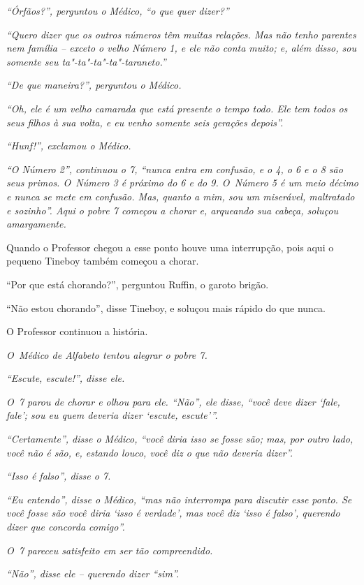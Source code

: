 \emph{``Órfãos?'', perguntou o Médico, ``o que quer dizer?''}

\emph{``Quero dizer que os outros números têm muitas relações. Mas não
tenho parentes nem família -- exceto o velho Número 1, e ele não conta
muito; e, além disso, sou somente seu ta"-ta"-ta"-ta"-taraneto.''}

\emph{``De que maneira?'', perguntou o Médico.}

\emph{``Oh, ele é um velho camarada que está presente o tempo todo. Ele
tem todos os seus filhos à sua volta, e eu venho somente seis gerações
depois''.}

\emph{``Hunf!'', exclamou o Médico.}

\emph{``O Número 2'', continuou o 7, ``nunca entra em confusão, e o 4, o
6 e o 8 são seus primos. O~Número 3 é próximo do 6 e do 9. O~Número 5 é
um meio décimo e nunca se mete em confusão. Mas, quanto a mim, sou um
miserável, maltratado e sozinho''. Aqui o pobre 7 começou a chorar e,
arqueando sua cabeça, soluçou amargamente.}

Quando o Professor chegou a esse ponto houve uma interrupção, pois aqui
o pequeno Tineboy também começou a chorar.

``Por que está chorando?'', perguntou Ruffin, o garoto brigão.

``Não estou chorando'', disse Tineboy, e soluçou mais rápido do que
nunca.

O Professor continuou a história.

\emph{O~Médico de Alfabeto tentou alegrar o pobre 7.}

\emph{``Escute, escute!'', disse ele.}

\emph{O~7 parou de chorar e olhou para ele. ``Não'', ele disse, ``você
deve dizer `fale, fale'; sou eu quem deveria dizer `escute,
escute'''.}

\emph{``Certamente'', disse o Médico, ``você diria isso se fosse são;
mas, por outro lado, você não é são, e, estando louco, você diz o que
não deveria dizer''.}

\emph{``Isso é falso'', disse o 7.}

\emph{``Eu entendo'', disse o Médico, ``mas não interrompa para discutir
esse ponto. Se você fosse são você diria `isso é verdade', mas você diz
`isso é falso', querendo dizer que concorda comigo''.}

\emph{O~7 pareceu satisfeito em ser tão compreendido.}

\emph{``Não'', disse ele -- querendo dizer ``sim''.}

